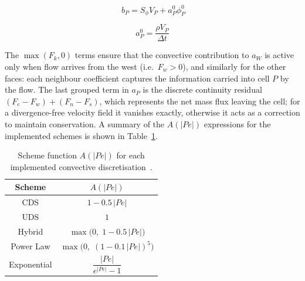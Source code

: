 \begin{equation}~\label{eqConv_bp}
    b_P = S_{\phi} V_P + a^0_P \phi^0_P
\end{equation}

\begin{equation*}
    a^0_P = \frac{\rho V_P}{\Delta t}
\end{equation*}

The $\max(F_k,0)$ terms ensure that the convective contribution to $a_W$ is active only when flow arrives from the west (i.e.\ $F_w > 0$), and similarly for the other faces: each neighbour coefficient captures the information carried into cell $P$ by the flow. The last grouped term in $a_P$ is the discrete continuity residual $(F_e - F_w) + (F_n - F_s)$, which represents the net mass flux leaving the cell; for a divergence-free velocity field it vanishes exactly, otherwise it acts as a correction to maintain conservation. A summary of the $A(|Pe|)$ expressions for the implemented schemes is shown in Table~\ref{tabConvSchemes}.

\begin{table}[ht]
    \centering
    \begin{tabular}{|c|c|}
        \hline
        Scheme & $A(|Pe|)$ \\
        \hline
        CDS & $1 - 0.5\,|Pe|$ \\
        UDS & $1$ \\
        Hybrid & $\max\!\bigl(0,\;1 - 0.5\,|Pe|\bigr)$ \\
        Power Law & $\max\!\bigl(0,\;(1 - 0.1\,|Pe|)^5\bigr)$ \\
        Exponential & $\dfrac{|Pe|}{e^{|Pe|} - 1}$ \\
        \hline
    \end{tabular}{}
    \caption{Scheme function $A(|Pe|)$ for each implemented convective discretisation~\cite{Patankar}.}
    \label{tabConvSchemes}
\end{table}

